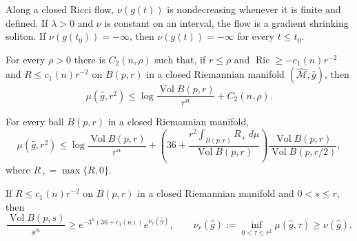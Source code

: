 \begin{lemma}
\label{lem:chow-ii-appd-nu-monotonicity}


Along a closed Ricci flow, $\nu(g(t))$ is nondecreasing whenever it is finite
and defined. If $\lambda>0$ and $\nu$ is constant on an interval, the flow is
a gradient shrinking soliton. If $\nu(g(t_0))=-\infty$, then
$\nu(g(t))=-\infty$ for every $t\leq t_0$.
\end{lemma}

\begin{proposition}
\label{prop:chow-ii-appd-mu-controls-volume-ratios}


For every $\rho>0$ there is $C_2(n,\rho)$ such that, if $r\leq\rho$ and
$\operatorname{Ric}\geq-c_1(n)r^{-2}$ and $R\leq c_1(n)r^{-2}$ on
$B(p,r)$ in a closed Riemannian manifold $(\widehat{\mathcal M},\hat g)$,
then
\[
 \mu(\hat g,r^2)\leq
 \log\frac{\operatorname{Vol}B(p,r)}{r^n}+C_2(n,\rho).
\]
\end{proposition}

\begin{proposition}
\label{prop:chow-ii-appd-bound-mu-local-geometry}


For every ball $B(p,r)$ in a closed Riemannian manifold,
\[
 \mu(\hat g,r^2)\leq\log\frac{\operatorname{Vol}B(p,r)}{r^n}
 +\left(36+\frac{r^2\int_{B(p,r)}R_+\,d\mu}
 {\operatorname{Vol}B(p,r)}\right)
 \frac{\operatorname{Vol}B(p,r)}{\operatorname{Vol}B(p,r/2)},
\]
where $R_+=\max\{R,0\}$.
\end{proposition}

\begin{proposition}
\label{prop:chow-ii-appd-bound-volume-ratios-nu}


If $R\leq c_1(n)r^{-2}$ on $B(p,r)$ in a closed Riemannian manifold and
$0<s\leq r$, then
\[
 \frac{\operatorname{Vol}B(p,s)}{s^n}\geq
 e^{-3^n(36+c_1(n))}e^{\nu_r(\hat g)},
 \qquad
 \nu_r(\hat g):=\inf_{0<\tau\leq r^2}\mu(\hat g,\tau)\geq\nu(\hat g).
\]
\end{proposition}

